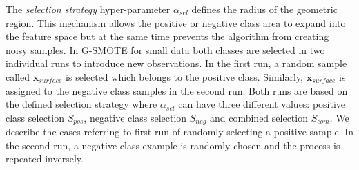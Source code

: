 \documentclass[parskip=full]{scrartcl}
\begin{document}
The \textit{selection strategy} hyper-parameter \( \alpha_{sel} \) defines the
radius of the geometric region. This mechanism allows the positive or negative
class area to expand into the feature space but at the same time prevents the
algorithm from creating noisy samples. In G-SMOTE for small data both classes
are selected in two individual runs to introduce new observations. In the first
run, a random sample called \( \textbf{x}_{surface} \) is selected which belongs
to the positive class. Similarly, \( \textbf{x}_{surface} \) is assigned to the
negative class samples in the second run. Both runs are based on the defined
selection strategy where \( \alpha_{sel} \) can have three different values:
positive class selection \( S_{pos} \), negative class selection \( S_{neg} \)
and combined selection \( S_{com} \). We describe the cases referring to first
run of randomly selecting a positive sample. In the second run, a negative class
example is randomly chosen and the process is repeated inversely. 
\end{document}

